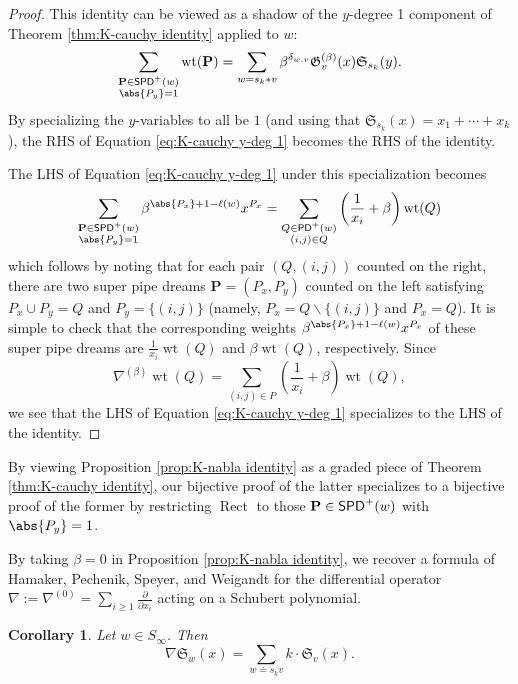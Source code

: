 \documentclass[11pt,reqno]{amsart} %
\newcommand{\frakS}{\mathfrak{S}}
\newcommand{\frakG}{\mathfrak{G}}
\newcommand{\bfP}{\mathbf{P}}
\newcommand{\sm}{\smallsetminus}
\DeclareMathOperator{\wt}{wt}
\DeclareMathOperator{\PD}{\sf{PD}}
\DeclareMathOperator{\SPD}{\sf{SPD}}
\DeclareMathOperator{\Rect}{Rect} %
\newtheorem{corollary}[theorem]{Corollary}
\theoremstyle{definition}
\begin{document}
\begin{proof}
This identity can be viewed as a shadow of the $y$-degree 1 component of Theorem \ref{thm:K-cauchy identity} applied to $w$:
\begin{equation}
\label{eq:K-cauchy y-deg 1}
    \sum_{\substack{
        \bfP\in \SPD^+(w)\\ \abs{P_y} = 1
    }} \wt(\bfP)
    = \sum_{
        w = s_k*v
    } \beta^{\delta_{w,v}}
    \frakG_v^{(\beta)}(x) \frakS_{s_k}(y).
\end{equation}
By specializing the $y$-variables to all be $1$ (and using that $\frakS_{s_k}(x) = x_1+\cdots+x_k$), the RHS of Equation \ref{eq:K-cauchy y-deg 1} becomes the RHS of the identity.

The LHS of Equation \ref{eq:K-cauchy y-deg 1} under this specialization becomes \begin{equation*}
    \sum_{\substack{
        \bfP\in \SPD^+(w) \\
        \abs{P_y} = 1
    }} \beta^{\abs{P_x}+1-\ell(w)} x^{P_x}
    = \sum_{\substack{
        Q\in \PD^+(w) \\
        (i,j)\in Q
    }}
    \left(\frac1{x_i} + \beta\right)\wt(Q)
\end{equation*}
which follows by noting that for each pair $(Q,(i,j))$ counted on the right, there are two super pipe dreams $\bfP = (P_x,P_y)$ counted on the left satisfying $P_x\cup P_y = Q$ and $P_y = \{(i,j)\}$ (namely, $P_x = Q\sm \{(i,j)\}$ and $P_x = Q$).
It is simple to check that the corresponding weights $\beta^{\abs{P_x}+1-\ell(w)}x^{P_x}$ of these super pipe dreams are $\frac1{x_i}\wt(Q)$ and $\beta\wt(Q)$, respectively.
Since \[
    \nabla^{(\beta)}\wt(Q) = \sum_{(i,j)\in P} \left(\frac1{x_i}+\beta\right)\wt(Q),
\] we see that the LHS of Equation \ref{eq:K-cauchy y-deg 1} specializes to the LHS of the identity.
\end{proof}

By viewing Proposition \ref{prop:K-nabla identity} as a graded piece of Theorem \ref{thm:K-cauchy identity},
our bijective proof of the latter specializes to a bijective proof of the former by restricting $\Rect$ to those $\bfP\in \SPD^+(w)$ with $\abs{P_y} = 1$.

By taking $\beta = 0$ in Proposition \ref{prop:K-nabla identity}, we recover a formula of Hamaker, Pechenik, Speyer, and Weigandt \cite{HamakerPechenikSpeyerWeigandt20} for the differential operator $
    \nabla
    := \nabla^{(0)}
    = \sum_{i\geq 1} \frac\partial{\partial x_i}
$ acting on a Schubert polynomial.
\begin{corollary}
\label{cor:nabla identity}
Let $w\in S_\infty$.
Then \[
    \nabla \frakS_w(x)
    = \sum_{
        w \doteq s_kv
    } k\cdot \frakS_v(x).
\]
\end{corollary}
\end{document}
